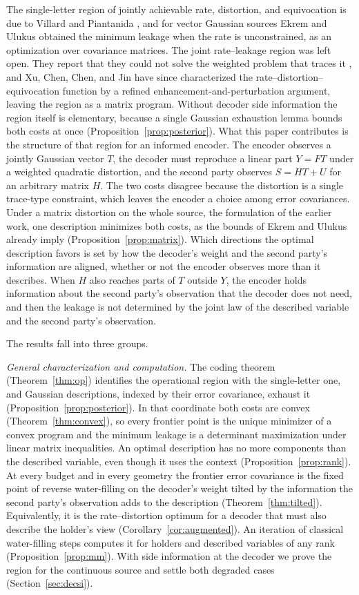 \documentclass[11pt,onecolumn]{IEEEtran}
\begin{document}
The single-letter region of jointly achievable rate, distortion, and
equivocation is due to Villard and Piantanida
\cite[Theorem~3]{villard2013}, and for vector Gaussian sources Ekrem and
Ulukus \cite{ekrem2013} obtained the minimum leakage when the rate is
unconstrained, as an optimization over covariance matrices. The joint
rate--leakage region was left open. They report that they could not
solve the weighted problem that traces it \cite[eqs.~(30)--(31)]{ekrem2013}, and Xu,
Chen, Chen, and Jin \cite{xu2024} have since characterized the
rate--distortion--equivocation function by a refined
enhancement-and-perturbation argument, leaving the region as a matrix
program. Without decoder side
information the region itself is elementary, because a single Gaussian
exhaustion lemma bounds both costs at once (Proposition~\ref{prop:posterior}).
What this paper contributes is the structure of that region for an
informed encoder. The
encoder observes a jointly Gaussian vector $T$, the decoder must
reproduce a linear part $Y=FT$ under a weighted quadratic distortion,
and the second party observes $S=HT+U$ for an arbitrary matrix $H$.
The two costs disagree because the distortion is a single trace-type
constraint, which leaves the encoder a choice among error covariances.
Under a matrix distortion on the whole source, the formulation of the
earlier work, one description minimizes both costs, as the bounds of
Ekrem and Ulukus already imply (Proposition~\ref{prop:matrix}). Which
directions the optimal description favors is set by how the decoder's
weight and the second party's information are aligned, whether or not
the encoder observes more than it describes. When $H$ also reaches
parts of $T$ outside $Y$, the encoder holds information about the second
party's observation that the decoder does not need, and then the
leakage is not determined by the joint law of the described variable
and the second party's observation.

The results fall into three groups.

\emph{General characterization and computation.} The coding theorem
(Theorem~\ref{thm:op}) identifies the operational region with the
single-letter one, and Gaussian descriptions, indexed by their error
covariance, exhaust it (Proposition~\ref{prop:posterior}). In that
coordinate both costs are convex (Theorem~\ref{thm:convex}), so every
frontier point is the unique minimizer of a convex program and the
minimum leakage is a determinant maximization under linear matrix
inequalities. An optimal description has no more components than the
described variable, even though it uses the context
(Proposition~\ref{prop:rank}). At every budget and in every geometry the
frontier error covariance is the fixed point of reverse water-filling on
the decoder's weight tilted by the information the second party's
observation adds to the description (Theorem~\ref{thm:tilted}).
Equivalently, it is the rate--distortion optimum for a decoder that must
also describe the holder's view (Corollary~\ref{cor:augmented}). An
iteration of classical water-filling steps computes it for holders and
described variables of any rank (Proposition~\ref{prop:mm}). With side
information at the decoder we prove the region for the continuous source
and settle both degraded cases (Section~\ref{sec:decsi}).
\end{document}
